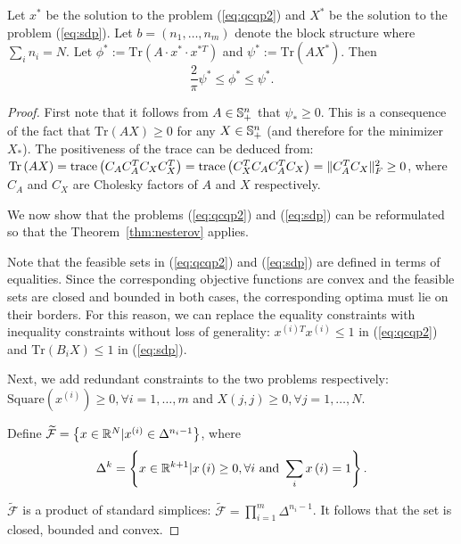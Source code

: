 \begin{theorem}
Let
$x^{*}$ be the solution to the problem (\ref{eq:qcqp2}) and
$X^*$ be the solution to the problem (\ref{eq:sdp}).
Let $b = \left(n_1,\ldots,n_m\right)$ denote the block structure where $\sum_i n_i = N$.
Let $\phi^*:= \mathrm{Tr}\left(A \cdot x^{*} \cdot x^{*T}\right)$ and
$\psi^* := \mathrm{Tr}\left(A X^{*}\right)$.
Then $$\frac{2}{\pi} \psi^* \leq \phi^* \leq \psi^*.$$
\end{theorem}

\begin{proof}
First note that it follows from $A \in \mathbb{S}_{+}^n$ that $\psi_* \geq
0$. This is a consequence of the fact that $\mathrm{Tr}\left(A X \right) \geq 0$ for any $X \in \mathbb{S}_+^n$
(and therefore for the minimizer $X_*$). The positiveness of the trace can be deduced from:
$\mathrm{Tr}\left(A X \right) = \mathrm{trace}\left(C_A C_A^T C_X C_X^T \right) =
\mathrm{trace}\left(C_X^T C_A C_A^T C_X \right) = \lVert C_A^T C_X\rVert_F^2 \geq 0 $,
where $C_A$ and $C_X$ are Cholesky factors of $A$ and $X$ respectively.

We now show that the problems (\ref{eq:qcqp2}) and (\ref{eq:sdp}) can be reformulated
so that the Theorem~\ref{thm:nesterov} applies.

Note that the feasible sets in (\ref{eq:qcqp2}) and
(\ref{eq:sdp}) are defined in terms of equalities. Since the corresponding objective
functions are convex and the feasible sets are closed and bounded in
both cases, the corresponding optima must lie on their borders. For this reason, we can
replace the equality constraints with inequality constraints without loss of generality:
$x^{(i)T}x^{(i)} \leq 1$ in (\ref{eq:qcqp2}) and $\mathrm{Tr} \left(B_i X\right) \leq 1$
in (\ref{eq:sdp}).

Next, we add redundant constraints to the two problems respectively:
$\mathrm{Square}\left(x^{(i)}\right) \geq 0, \forall i = 1,\ldots,m$
and $X\left(j,j\right) \geq 0, \forall j = 1,\ldots, N$.

Define $\widetilde{\mathcal{F}} = \left\{x \in \mathbb{R}^N | x^{(i)} \in \Delta^{n_i -1} \right\}$,
where $$\Delta^{k} = \left\{ x \in \mathbb{R}^{k+1} | x\left(i\right) \geq 0, \forall i ~\mathrm{and}~ \sum_i x\left(i\right) = 1 \right\}.$$

$\widetilde{\mathcal{F}}$ is a product of standard simplices: $\widetilde{\mathcal{F}} = \prod_{i = 1}^m \Delta^{n_i -1}$. It follows that the set is closed, bounded and convex.


\end{proof}
